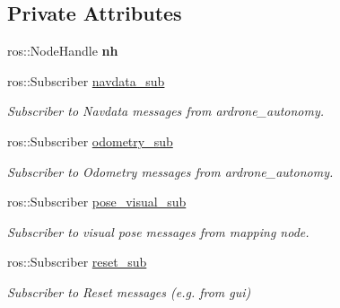 \subsection*{Private Attributes}
\begin{DoxyCompactItemize}
\item 
\mbox{\label{classPoseEstimator_adcbf38cabb7c5f157377c6aa5f263bda}} 
ros\+::\+Node\+Handle {\bfseries nh}
\item 
\mbox{\label{classPoseEstimator_a494ff9513ee5930ebba518a77c43341b}} 
ros\+::\+Subscriber \hyperlink{classPoseEstimator_a494ff9513ee5930ebba518a77c43341b}{navdata\+\_\+sub}
\begin{DoxyCompactList}\small\item\em Subscriber to Navdata messages from ardrone\+\_\+autonomy. \end{DoxyCompactList}\item 
\mbox{\label{classPoseEstimator_a02db92fc3a0ae907a1cf1472a335755a}} 
ros\+::\+Subscriber \hyperlink{classPoseEstimator_a02db92fc3a0ae907a1cf1472a335755a}{odometry\+\_\+sub}
\begin{DoxyCompactList}\small\item\em Subscriber to Odometry messages from ardrone\+\_\+autonomy. \end{DoxyCompactList}\item 
\mbox{\label{classPoseEstimator_a406a5393a202ead0ac70be31f91c0e03}} 
ros\+::\+Subscriber \hyperlink{classPoseEstimator_a406a5393a202ead0ac70be31f91c0e03}{pose\+\_\+visual\+\_\+sub}
\begin{DoxyCompactList}\small\item\em Subscriber to visual pose messages from mapping node. \end{DoxyCompactList}\item 
\mbox{\label{classPoseEstimator_a968a684959472a7c024001c83ab599e7}} 
ros\+::\+Subscriber \hyperlink{classPoseEstimator_a968a684959472a7c024001c83ab599e7}{reset\+\_\+sub}
\begin{DoxyCompactList}\small\item\em Subscriber to Reset messages (e.\+g. from gui) \end{DoxyCompactList}\item 

\end{DoxyCompactItemize}
